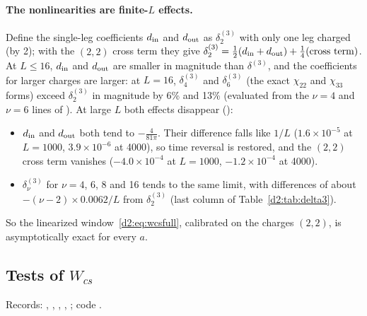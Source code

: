\paragraph{The nonlinearities are finite-$L$ effects.} Define the single-leg coefficients $d_{\rm in}$ and $d_{\rm out}$ as
$\delta^{(3)}_2$ with only one leg charged (by 2); with the $(2,2)$ cross term they give $\delta^{(3)}_2=\frac12(d_{\rm in}+d_{\rm
out})+\frac14(\text{cross term})$. At $L\le16$, $d_{\rm in}$ and $d_{\rm out}$ are smaller in magnitude than $\delta^{(3)}$, and
the coefficients for larger charges are larger: at $L=16$, $\delta^{(3)}_4$ and $\delta^{(3)}_6$ (the exact $\chi_{22}$ and $\chi_{33}$ forms)
exceed $\delta^{(3)}_2$ in magnitude by 6\% and 13\% (evaluated from the $\nu=4$ and $\nu=6$ lines of
). At large $L$ both effects disappear
():
\begin{itemize}
\item $d_{\rm in}$ and $d_{\rm out}$ both tend to $-\frac4{81\pi}$. Their difference falls like $1/L$ ($1.6\times10^{-5}$ at
 $L=1000$, $3.9\times10^{-6}$ at 4000), so time reversal is restored, and the $(2,2)$ cross term vanishes
 ($-4.0\times10^{-4}$ at $L=1000$, $-1.2\times10^{-4}$ at 4000).
\item $\delta^{(3)}_\nu$ for $\nu=4$, 6, 8 and 16 tends to the same limit, with differences of about $-(\nu-2)\times0.0062/L$ from
 $\delta^{(3)}_2$ (last column of Table~\ref{d2:tab:delta3}).
\end{itemize}
So the linearized window~\eqref{d2:eq:wcsfull}, calibrated on the charges $(2,2)$, is asymptotically exact for every $a$.

\subsection{Tests of \texorpdfstring{$W_{cs}$}{Wcs}}\label{d2:app:wcstests}
{\small\raggedright\noindent Records: ,
, ,
, ; code .\par}

